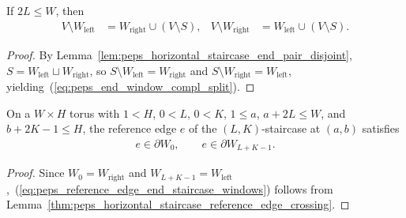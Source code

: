 \begin{lemma}
    \label{lem:peps_horizontal_staircase_end_window_complement_split}
    \leanok
    If $2L\le W$, then
    \begin{align}
        V\setminus W_{\mathrm{left}}
         & =W_{\mathrm{right}}\cup (V\setminus S),
         &
        V\setminus W_{\mathrm{right}}
         & =W_{\mathrm{left}}\cup (V\setminus S).
        \label{eq:peps_end_window_compl_split}
    \end{align}
\end{lemma}
\begin{proof}\leanok
    By Lemma~\ref{lem:peps_horizontal_staircase_end_pair_disjoint},
    $S=W_{\mathrm{left}}\sqcup W_{\mathrm{right}}$, so
    $S\setminus W_{\mathrm{left}}=W_{\mathrm{right}}$ and
    $S\setminus W_{\mathrm{right}}=W_{\mathrm{left}}$, yielding~(\ref{eq:peps_end_window_compl_split}).
\end{proof}

\begin{lemma}
    \label{thm:peps_staircase_end_reference_edge_boundary}
    \leanok
    On a $W\times H$ torus with $1<H$, $0<L$, $0<K$, $1\le a$, $a+2L\le W$, and
    $b+2K-1\le H$, the reference edge $e$ of the $(L,K)$-staircase at $(a,b)$
    satisfies
    \begin{align}
        e\in\partial W_0,\qquad e\in\partial W_{L+K-1}.
        \label{eq:peps_reference_edge_end_staircase_windows}
    \end{align}
\end{lemma}
\begin{proof}\leanok
    Since $W_0=W_{\mathrm{right}}$ and $W_{L+K-1}=W_{\mathrm{left}}$,~(\ref{eq:peps_reference_edge_end_staircase_windows})
    follows from Lemma~\ref{thm:peps_horizontal_staircase_reference_edge_crossing}.
\end{proof}

